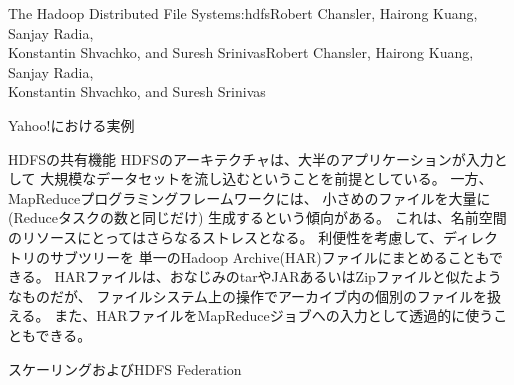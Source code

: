 \begin{aosachaptertoc}{The Hadoop Distributed File System}{s:hdfs}{Robert Chansler, Hairong Kuang, Sanjay Radia, \\ Konstantin Shvachko, and Suresh Srinivas}{Robert Chansler, Hairong Kuang, Sanjay Radia, \\ \hspace*{0.9cm} Konstantin Shvachko, and Suresh Srinivas}
\begin{aosasect1}{Yahoo!における実例}
\begin{aosasect2}{HDFSの共有機能}
HDFSのアーキテクチャは、大半のアプリケーションが入力として
大規模なデータセットを流し込むということを前提としている。
一方、MapReduceプログラミングフレームワークには、
小さめのファイルを大量に(Reduceタスクの数と同じだけ)
生成するという傾向がある。
これは、名前空間のリソースにとってはさらなるストレスとなる。
利便性を考慮して、ディレクトリのサブツリーを
単一のHadoop Archive(HAR)ファイルにまとめることもできる。
HARファイルは、おなじみのtarやJARあるいはZipファイルと似たようなものだが、
ファイルシステム上の操作でアーカイブ内の個別のファイルを扱える。
また、HARファイルをMapReduceジョブへの入力として透過的に使うこともできる。

\end{aosasect2}

\begin{aosasect2}{スケーリングおよびHDFS Federation}


\end{aosasect2}
\end{aosasect1}
\end{aosachaptertoc}
